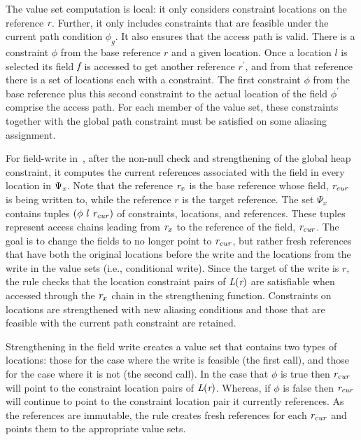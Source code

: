   

The value set computation is local: it only considers constraint
locations on the reference $\emph{r}$. Further, it only includes
constraints that are feasible under the current path condition
$\phi_g$. It also ensures that the access path is valid. There is a
constraint $\phi$ from the base reference $r$ and a given
location. Once a location $l$ is selected its field $\emph{f}$ is
accessed to get another reference $r^\prime$, and from that reference
there is a set of locations each with a constraint. The first
constraint $\phi$ from the base reference plus this second constraint
to the actual location of the field $\phi^\prime$ comprise the access
path. For each member of the value set, these constraints together
with the global path constraint must be satisfied on some aliasing
assignment. %


For field-write in~, after the non-null check and
strengthening of the global heap constraint, it computes the current
references associated with the field in every location in
$\Psi_{\emph{x}}$. Note that the reference $\emph{r}_x$ is the base
reference whose field, $\emph{r}_\mathit{cur}$ is being written to,
while the reference $r$ is the target reference. The set $\Psi_x$
contains tuples $(\phi\ l\ \cfgnt{r}_\mathit{cur})$ of constraints,
locations, and references. These tuples represent access chains
leading from $\emph{r}_x$ to the reference of the field,
$\emph{r}_\mathit{cur}$. The goal is to change the fields to no
longer point to $\emph{r}_\mathit{cur}$, but rather fresh references
that have both the original locations before the write and the
locations from the write in the value sets (i.e., conditional
write). Since the target of the write is $r$, the rule checks that the
location constraint pairs of $\emph{L}(\emph{r})$ are satisfiable
when accessed through the $\emph{r}_x$ chain in the strengthening
function.   Constraints on locations are strengthened
with new aliasing conditions and those that are feasible with the
current path constraint are retained.

Strengthening in the field write creates a value set that contains two
types of locations: those for the case where the write is feasible
(the first call), and those for the case where it is not (the second
call). In the case that $\phi$ is true then $\emph{r}_\mathit{cur}$
will point to the constraint location pairs of $\emph{L}(\emph{r})$.
Whereas, if $\phi$ is false then $\emph{r}_\mathit{cur}$ will
continue to point to the constraint location pair it currently
references.  As the references are immutable, the rule creates fresh
references for each $\emph{r}_\mathit{cur}$ and points them to the
appropriate value sets.

